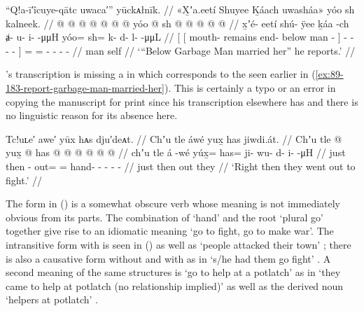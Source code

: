 \ex\label{ex:89-185-reporting-garbage-man-married-her}%
%
\begingl
	\glpreamble	“Q!a-ī′îcuye-qātc uwaca′” yūckᴀłnīk. //
	\glpreamble	«\!X̱ʼa.eetí Shuyee Ḵáach uwasháa\!» yóo sh kalneek. //
	\gla	{} {}  @ {}  @ {}  @ {} {}
			 @ {} @ {} @ {} @ {} {}
		yóo @ sh @  @ {} @ {} @ {} @ {} //
	\glb	{} {} x̱ʼé- eetí shú- ÿee ḵáa -ch {}
			ⱥ- u- i-  -μμH {}
		yóo= sh= k- d- l-  -μμL //
	\glc	{}[ {}[ mouth- remains end- below man - {}]
			- - -  - {}]
		= = - - -  - //
	\gld	{} {}  {}  {} man {} {}
			 {} {} {} {} {}
		 self\•  {} {} {} {} //
	\glft	‘“Below Garbage Man married her” he reports.’
		//
\endgl
\xe

\citeauthor{swanton:1909}’s transcription  is missing a  in  which corresponds to the  seen earlier in (\ref{ex:89-183-report-garbage-man-married-her}).
This is certainly a typo or an error in copying the manuscript for print since his transcription elsewhere has  and there is no linguistic reason for its absence here.

\ex\label{ex:89-186-went-to-fight}%
%
\begingl
	\glpreamble	Tc!uʟe′ awe′ yūx hᴀs dju′deᴀt. //
	\glpreamble	Chʼu tle áwé yux̱ has jiwdi.át. //
	\gla	Chʼu tle  @ {}
		yux̱ @ has @  @ {} @ {} @ {} @ {} @ {} //
	\glb	chʼu tle á -wé
		yúx̱= has= ji- wu- d- i-  -μH //
	\glc	just then  -
		out= = hand- - - -  - //
	\gld	just then  {}
		out they\•  {} {} {} {} {} //
	\glft	‘Right then they went out to fight.’
		//
\endgl
\xe

The form  in (\lastx) is a somewhat obscure verb whose meaning is not immediately obvious from its parts.
The combination of  ‘hand’ and the root  ‘plural go’ together give rise to an idiomatic meaning ‘go to fight, go to make war’.
The intransitive form with  is seen in (\lastx) as well as  ‘people attacked their town’ \parencite[23.114]{story-naish:1973}; there is also a causative form without  and with  as in  ‘s/he had them go fight’ \parencite[02/75]{leer:1973}.
A second meaning of the same structures is ‘go to help at a potlatch’ as in  ‘they came to help at potlatch (no relationship implied)’ as well as the derived noun  ‘helpers at potlatch’ \parencite[02/75]{leer:1973}.

